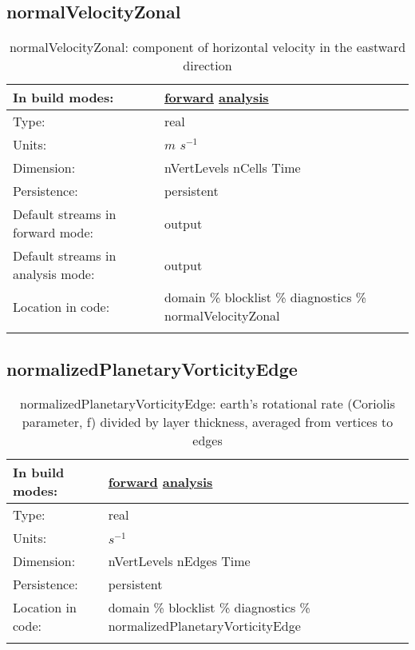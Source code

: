 \subsection[normalVelocityZonal]{normalVelocityZonal}
\label{subsec:var_sec_diagnostics_normalVelocityZonal}
\begin{center}
\begin{longtable}{| p{2.0in} | p{4.0in} |}
        \hline 
        In build modes: & \hyperref[subsec:forward_var_tab_diagnostics]{forward} \hyperref[subsec:analysis_var_tab_diagnostics]{analysis} \\
        \hline 
        Type: & real \\
        \hline 
        Units: & $m$ $s^{-1}$ \\
        \hline 
        Dimension: & nVertLevels nCells Time \\
        \hline 
        Persistence: & persistent \\
        \hline 
		 Default streams in forward mode: &  output \\
        \hline 
		 Default streams in analysis mode: &  output \\
        \hline 
		 Location in code: & domain \% blocklist \% diagnostics \% normalVelocityZonal \\
		 \hline 
    \caption{normalVelocityZonal: component of horizontal velocity in the eastward direction}
\end{longtable}
\end{center}
\subsection[normalizedPlanetaryVorticityEdge]{normalizedPlanetaryVorticityEdge}
\label{subsec:var_sec_diagnostics_normalizedPlanetaryVorticityEdge}
\begin{center}
\begin{longtable}{| p{2.0in} | p{4.0in} |}
        \hline 
        In build modes: & \hyperref[subsec:forward_var_tab_diagnostics]{forward} \hyperref[subsec:analysis_var_tab_diagnostics]{analysis} \\
        \hline 
        Type: & real \\
        \hline 
        Units: & $s^{-1}$ \\
        \hline 
        Dimension: & nVertLevels nEdges Time \\
        \hline 
        Persistence: & persistent \\
        \hline 
		 Location in code: & domain \% blocklist \% diagnostics \% normalizedPlanetaryVorticityEdge \\
		 \hline 
    \caption{normalizedPlanetaryVorticityEdge: earth's rotational rate (Coriolis parameter, f) divided by layer thickness, averaged from vertices to edges}
\end{longtable}
\end{center}
